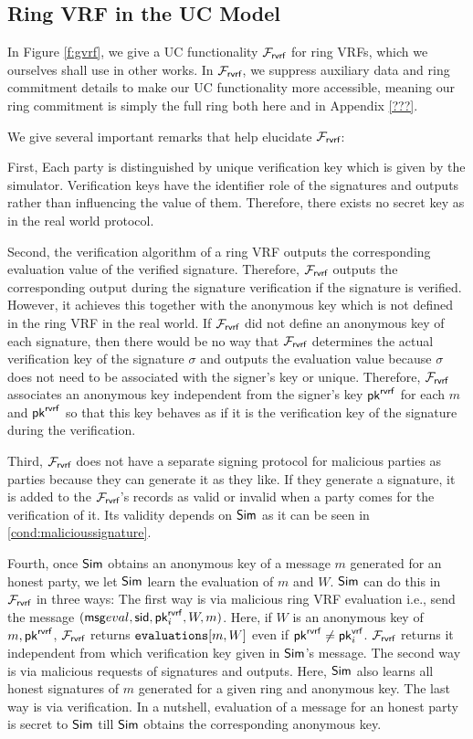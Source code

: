 \subsection{Ring VRF in the UC Model}

In Figure \ref{f:gvrf}, we give a UC functionality $\mathcal{F}_{\textsf{rvrf}}$ for ring VRFs,
which we ourselves shall use in other works.  In $\mathcal{F}_{\textsf{rvrf}}$, we suppress
auxiliary data and ring commitment details to make our UC functionality
more accessible, meaning our ring commitment is simply the full ring both
here and in Appendix \ref{???}.

We give several important remarks that help elucidate $\mathcal{F}_{\textsf{rvrf}}$:

First, Each party is distinguished by unique verification key which is given by the simulator. Verification keys have the identifier role of  the signatures and outputs rather than  influencing the value of them. Therefore, there exists no secret key as in the real world protocol.

Second, the verification algorithm of a ring VRF outputs the corresponding evaluation value of the verified signature. Therefore, $ \mathcal{F}_{\textsf{rvrf}} $  outputs the corresponding output during the signature verification if the signature is verified. However, it achieves this together with the anonymous key which is not defined in the ring VRF in the real world.  If $ \mathcal{F}_{\textsf{rvrf}} $ did not define an anonymous key of each signature, then there would be no way that $ \mathcal{F}_{\textsf{rvrf}} $ determines the actual verification key of the signature $ \sigma $ and outputs the evaluation value because $ \sigma $ does not need to be associated with the signer's key or unique. Therefore, $ \mathcal{F}_{\textsf{rvrf}} $ associates an anonymous key independent from the signer's key $ \mathsf{pk}^{\mathsf{rvrf}} $ for each $ m $ and $ \mathsf{pk}^{\mathsf{rvrf}} $ so that this key behaves as if it is the verification key of the signature during the verification.
	
Third, $ \mathcal{F}_{\textsf{rvrf}} $ does not have a separate signing protocol for malicious parties as parties because they can generate it as they like. If they generate a signature, it is added to the $ \mathcal{F}_{\textsf{rvrf}} $'s records as valid or invalid when a party comes for the verification of it.  Its validity depends on $ \mathsf{Sim} $ as it can be seen in \ref{cond:malicioussignature}. 
	
Fourth, once $ \mathsf{Sim} $ obtains an anonymous key of a message $ m $ generated for an honest party, we let $ \mathsf{Sim} $ learn the  evaluation of  $ m $ and  $ W $. $ \mathsf{Sim} $ can do this in $ \mathcal{F}_{\textsf{rvrf}} $ in three ways: The first way is via malicious ring VRF evaluation i.e., send the message $ (\mathsf{msg}{eval}, \textsf{sid}, \mathsf{pk}^{\mathsf{rvrf}}_i,W,m) $. Here, if $ W $ is an anonymous key of $ m, \mathsf{pk}^{\mathsf{rvrf}}  $, $ \mathcal{F}_{\textsf{rvrf}} $ returns $ \texttt{evaluations}[m, W] $ even if $ \mathsf{pk}^{\mathsf{rvrf}} \neq \mathsf{pk}^{\mathsf{vrf}}_i $. $ \mathcal{F}_{\textsf{rvrf}} $ returns it independent from which verification key given in $ \mathsf{Sim} $'s message. The second way is via malicious requests of signatures and outputs.  Here, $ \mathsf{Sim} $ also learns  all honest signatures of $ m $ generated for a given ring and anonymous key. The last way is via verification.  In a nutshell, evaluation of a message for an honest party is secret to $ \mathsf{Sim} $ till $ \mathsf{Sim} $ obtains the corresponding anonymous key.
	
